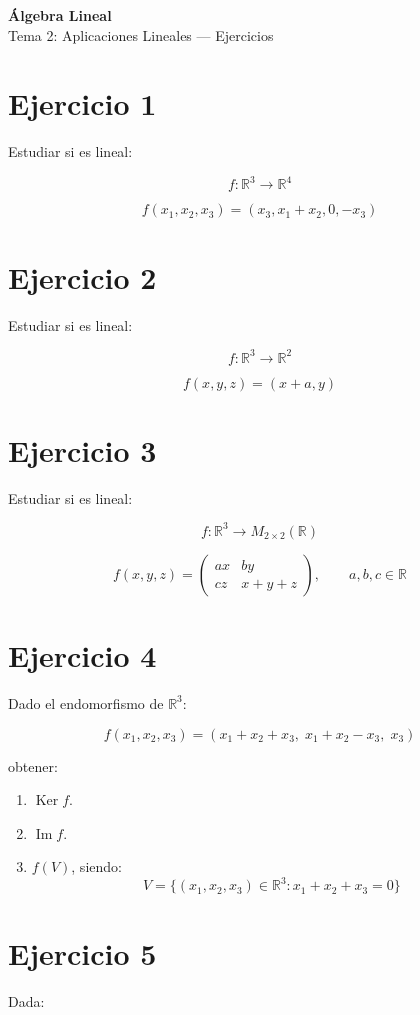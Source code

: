 \documentclass[11pt,a4paper]{article}
\newcommand{\R}{\mathbb{R}}
\newcommand{\Ker}{\operatorname{Ker}}
\newcommand{\Ima}{\operatorname{Im}}
\begin{document}
\begin{center}
	{\LARGE\bfseries Álgebra Lineal}\\[0.4em]
	{\Large Tema 2: Aplicaciones Lineales --- Ejercicios}
\end{center}

\section{Ejercicio 1}
Estudiar si es lineal:

\[
f:\R^3\longrightarrow\R^4
\]

\[
f(x_1,x_2,x_3)
=
(x_3,x_1+x_2,0,-x_3)
\]

\section{Ejercicio 2}
Estudiar si es lineal:

\[
f:\R^3\longrightarrow\R^2
\]

\[
f(x,y,z)=(x+a,y)
\]

\section{Ejercicio 3}
Estudiar si es lineal:

\[
f:\R^3\longrightarrow M_{2\times2}(\R)
\]

\[
f(x,y,z)
=
\begin{pmatrix}
ax&by\\
cz&x+y+z
\end{pmatrix},
\qquad
a,b,c\in\R
\]

\section{Ejercicio 4}
Dado el endomorfismo de $\R^3$:

\[
f(x_1,x_2,x_3)
=
(x_1+x_2+x_3,\;x_1+x_2-x_3,\;x_3)
\]

obtener:

\begin{enumerate}[label=\alph*)]
	\item $\Ker f$.
	\item $\Ima f$.
	\item $f(V)$, siendo:
	\[
	V=
	\{(x_1,x_2,x_3)\in\R^3:x_1+x_2+x_3=0\}
	\]
\end{enumerate}

\section{Ejercicio 5}
Dada:
\end{document}
